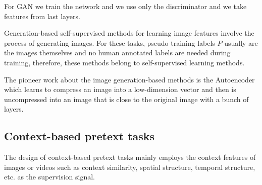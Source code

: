 For GAN we train the network and we use only the discriminator and we take features
from last layers.

Generation-based self-supervised methods for learning image features involve the
process of generating images. For these tasks, pseudo training labels $P$ usually
are the images themselves and no human annotated labels are needed during training,
therefore, these methods belong to self-supervised learning methods.

The pioneer work about the image generation-based methods is the Autoencoder which
learns to compress an image into a low-dimension vector and then is uncompressed
into an image that is close to the original image with a bunch of layers.
\subsection{Context-based pretext tasks}
The design of context-based pretext tasks mainly employs the context features of
images or videos such as context similarity, spatial structure, temporal structure,
etc. as the supervision signal.
